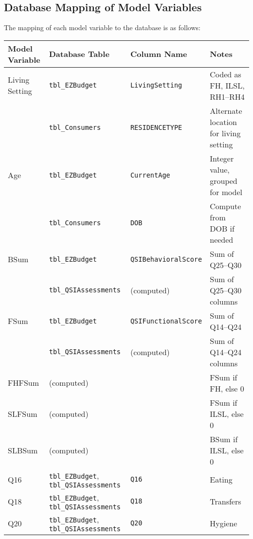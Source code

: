 \subsection{Database Mapping of Model Variables}

The mapping of each model variable to the database is as follows:

\begin{center}
\begin{tabular}{|l|l|l|l|}
\hline
\textbf{Model Variable} & \textbf{Database Table} & \textbf{Column Name} & \textbf{Notes} \\
\hline
Living Setting  & \texttt{tbl\_EZBudget}   & \texttt{LivingSetting}   & Coded as FH, ILSL, RH1--RH4 \\
                & \texttt{tbl\_Consumers}  & \texttt{RESIDENCETYPE}  & Alternate location for living setting \\
\hline
Age             & \texttt{tbl\_EZBudget}   & \texttt{CurrentAge}      & Integer value, grouped for model \\
                & \texttt{tbl\_Consumers}  & \texttt{DOB}             & Compute from DOB if needed \\
\hline
BSum            & \texttt{tbl\_EZBudget}   & \texttt{QSIBehavioralScore} & Sum of Q25--Q30 \\
                & \texttt{tbl\_QSIAssessments} & (computed)         & Sum of Q25--Q30 columns \\
\hline
FSum            & \texttt{tbl\_EZBudget}   & \texttt{QSIFunctionalScore} & Sum of Q14--Q24 \\
                & \texttt{tbl\_QSIAssessments} & (computed)         & Sum of Q14--Q24 columns \\
\hline
FHFSum          & (computed)               &                          & FSum if FH, else 0 \\
SLFSum          & (computed)               &                          & FSum if ILSL, else 0 \\
SLBSum          & (computed)               &                          & BSum if ILSL, else 0 \\
\hline
Q16             & \texttt{tbl\_EZBudget}, \texttt{tbl\_QSIAssessments} & \texttt{Q16}  & Eating \\
Q18             & \texttt{tbl\_EZBudget}, \texttt{tbl\_QSIAssessments} & \texttt{Q18}  & Transfers \\
Q20             & \texttt{tbl\_EZBudget}, \texttt{tbl\_QSIAssessments} & \texttt{Q20}  & Hygiene \\

\end{tabular}
\end{center}
